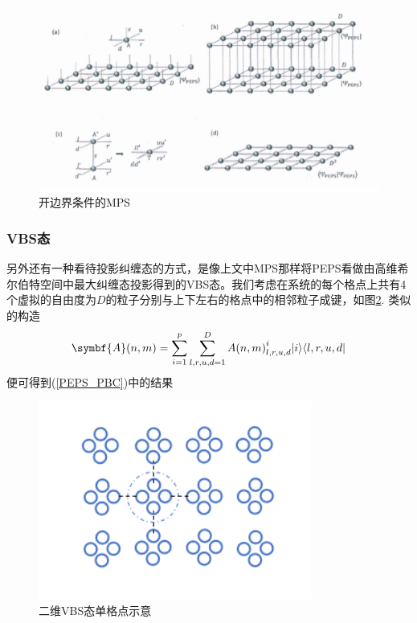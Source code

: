\begin{figure}[htb]
	\centering
	\includegraphics[width=1\textwidth]{image/PEPS1.png}
	\caption{开边界条件的MPS}
	\label{fig:PEPS}
\end{figure}

\subsubsection{VBS态}

另外还有一种看待投影纠缠态的方式，是像上文中MPS那样将PEPS看做由高维希尔伯特空间中最大纠缠态投影得到的VBS态。我们考虑在系统的每个格点上共有4个虚拟的自由度为$D$的粒子分别与上下左右的格点中的相邻粒子成键，如图\ref{fig:VBS4}. 类似的构造
\begin{equation}
\symbf{A}(n,m) = \sum_{i=1}^p\sum_{l,r,u,d=1}^D {A(n,m)}^i_{l,r,u,d}\ket{i}\bra{l,r,u,d}
\end{equation}
便可得到(\ref{PEPS_PBC})中的结果

\begin{figure}[htb]
	\centering
	\includegraphics[width=0.8\textwidth]{image/VBS4.png}
	\caption{二维VBS态单格点示意}
	\label{fig:VBS4}
\end{figure}

